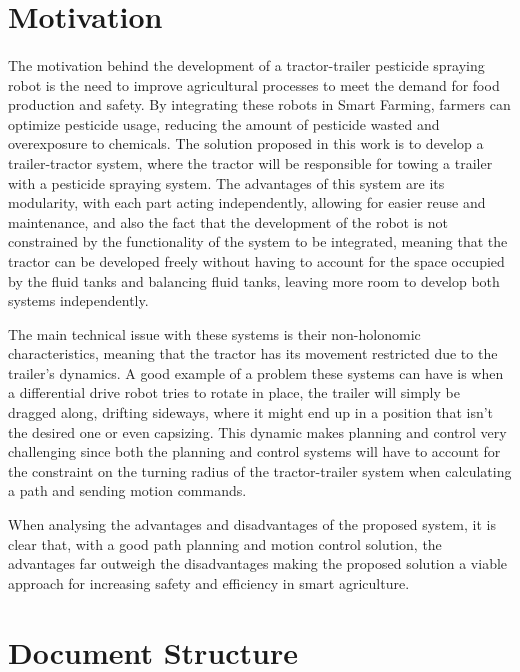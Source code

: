 \section{Motivation}
\label{sec:motivation}
\paragraph{}The motivation behind the development of a tractor-trailer pesticide spraying robot is the need to improve agricultural 
processes to meet the demand for food production and safety. By integrating these robots in Smart Farming, 
farmers can optimize pesticide usage, reducing the amount of pesticide wasted and overexposure to 
chemicals. The solution proposed in this work is to develop a trailer-tractor system, where the tractor will be responsible for 
towing a trailer with a pesticide spraying system. The advantages of this system are its modularity, with each part acting 
independently, allowing for easier reuse and maintenance, and also the fact that the development of the robot is not constrained by
the functionality of the system to be integrated, meaning that the tractor can be developed freely without having to account 
for the space occupied by the fluid tanks and balancing fluid tanks, leaving more room to develop both systems independently. 

The main technical issue with these systems is their non-holonomic 
characteristics, meaning that the tractor has its movement restricted due to the trailer's dynamics. A 
good example of a problem these systems can have is when a differential drive robot tries to rotate in place, the trailer will 
simply be dragged along, drifting sideways, where it might end up in a position that isn't the desired one or even capsizing. 
This dynamic makes planning and control very challenging since both the planning and control systems will have to account for 
the constraint on the turning radius of the tractor-trailer system when calculating a path and sending motion commands. 

When analysing the advantages and disadvantages of the proposed system, it is clear that, with a good path planning
and motion control solution, the advantages far outweigh the disadvantages making the proposed solution a viable  
approach for increasing safety and efficiency in smart agriculture.

\section{Document Structure}
\label{sec:documentstruct}
